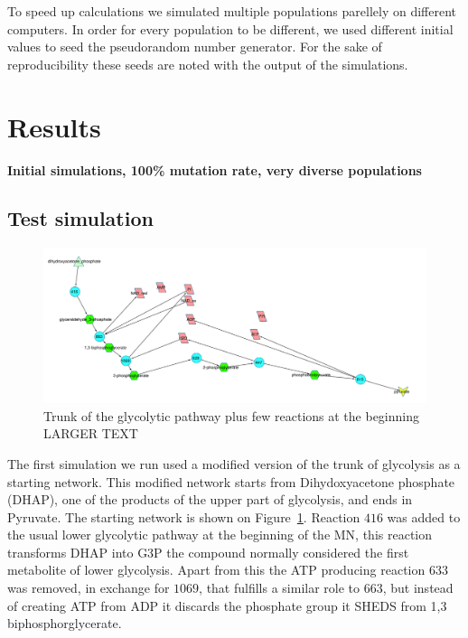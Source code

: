 \documentclass[10pt,a4paper]{article}
\begin{document}
	To speed up calculations we simulated multiple populations parellely on different computers. In order for every population to be different, we used different initial values to seed the pseudorandom number generator. For the sake of reproducibility these seeds are noted with the output of the simulations. 


\section{Results}
\label{sec:results}

\textbf{Initial simulations, 100\% mutation rate, very diverse populations}

\subsection{Test simulation}
\label{sub:test_simulation}

\begin{figure}[htpb]
	\centering
	\includegraphics[width=1\linewidth]{trunk_glyc_init.pdf}
	\caption{Trunk of the glycolytic pathway plus few reactions at the beginning LARGER TEXT}
	\label{fig:truncglycinit}
\end{figure}

The first simulation we run used a modified version of the trunk of glycolysis as a starting network. This modified network starts from Dihydoxyacetone phosphate (DHAP), one of the products of the upper part of glycolysis,  and ends in Pyruvate. The starting network is shown on Figure~\ref{fig:truncglycinit}.  Reaction $416$ was added to the usual lower glycolytic pathway at the beginning of the MN, this reaction transforms DHAP into G3P the compound normally considered the first metabolite of lower glycolysis.  Apart from this the ATP producing reaction $633$ was removed, in exchange for $1069$, that fulfills a similar role to $663$, but instead of creating ATP from ADP it discards the phosphate group it SHEDS from 1,3 biphosphorglycerate.
\end{document}

